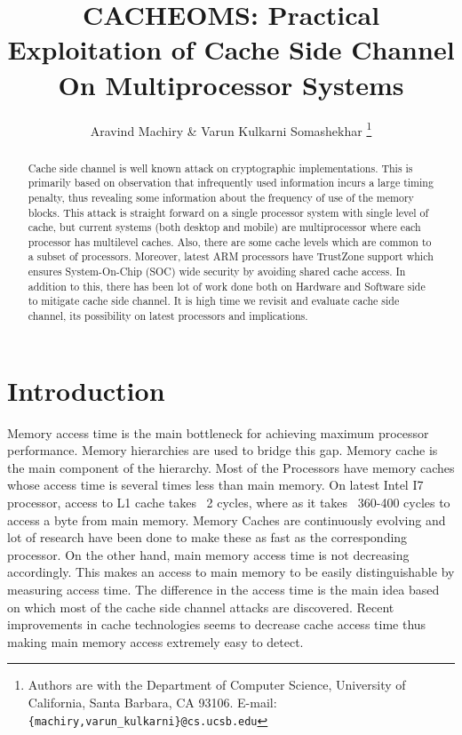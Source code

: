 \documentclass[twocolumn]{IEEEtran}
\begin{document}
\title{CACHEOMS: Practical Exploitation of \textbf{Cache} Side Channel \textbf{O}n \textbf{M}ultiprocessor \textbf{S}ystems}


\author{Aravind Machiry \& Varun Kulkarni Somashekhar
\thanks{Authors are with the
Department of Computer Science,
University of California, Santa Barbara, CA 93106.
E-mail: \texttt{\{machiry,varun\_kulkarni\}@cs.ucsb.edu}}
}

\maketitle

\begin{abstract}
Cache side channel is well known attack on cryptographic implementations\cite{bernstein2005cache}\cite{aciccmez2006trace}\cite{banescu2011cache}. This is primarily based on observation that infrequently used information incurs a large timing penalty, thus revealing some information about the frequency of use of the memory blocks. This attack is straight forward on a single processor system with single level of cache, but current systems (both desktop and mobile) are multiprocessor where each processor has multilevel caches. Also,
there are some cache levels which are common to a subset of processors. Moreover, latest ARM processors have TrustZone support\cite{frenzel2010arm} which ensures System-On-Chip (SOC) wide security by avoiding shared cache access. In addition to this, there has been lot of work done both on Hardware and Software side to mitigate cache side channel\cite{180212}\cite{wang2007new}. It is high time we revisit and evaluate cache side channel, its possibility on latest processors and implications\cite{184415}.\\
\end{abstract}

\section {Introduction}
Memory access time is the main bottleneck for achieving maximum processor performance. Memory hierarchies are used to bridge this gap. Memory cache is the main component of the hierarchy. Most of the Processors have memory caches whose access time is several times less than main memory. On latest Intel I7 processor, access to L1 cache takes ~2 cycles, where as it takes ~360-400 cycles to access a byte from main memory. Memory Caches are continuously evolving and lot of research have been done to make these as fast as the corresponding processor. On the other hand, main memory access time is not decreasing accordingly. This makes an access to main memory to be easily distinguishable by measuring access time. The difference in the access time is the main idea based on which most of the cache side channel attacks are discovered. Recent improvements in cache technologies seems to decrease cache access time thus making main memory access extremely easy to detect. 
\end{document}
